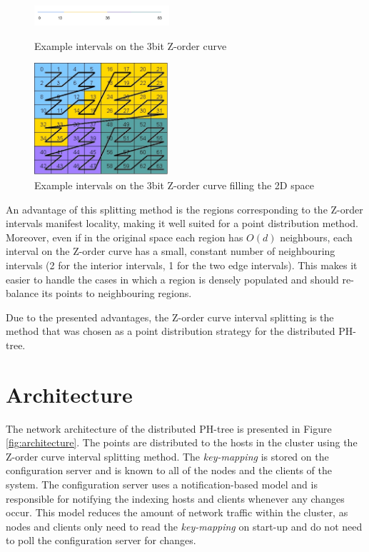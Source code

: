 \documentclass[11pt,a4paper]{globis-book}
\begin{document}
\begin{figure}[t]
    \centering
\parbox{5cm}{
    \includegraphics[width=5cm]{images/zorder-line}
    \caption{Example intervals on the 3bit Z-order curve}
    \label{fig:zorder-line}}
\qquad
\begin{minipage}{5cm}
    \includegraphics[width=5cm]{images/zorder-square}
    \caption{Example intervals on the 3bit Z-order curve filling the 2D space}
    \label{fig:zorder-square}
\end{minipage}
\end{figure}

An advantage of this splitting method is the regions corresponding to the Z-order intervals manifest locality, making it well suited for a point distribution method. Moreover, even if in the original space each region has $O(d)$ neighbours, each interval on the Z-order curve has a small, constant number of neighbouring intervals (2 for the interior intervals, 1 for the two edge intervals). This makes it easier to handle the cases in which a region is densely populated and should re-balance its points to neighbouring regions. 

Due to the presented advantages, the Z-order curve interval splitting is the method that was chosen as a point distribution strategy for the distributed PH-tree. 

\section{Architecture}
\label{sec:distindex-architectures}

The network architecture of the distributed PH-tree is presented in Figure \ref{fig:architecture}. The points are distributed to the hosts in the cluster using the Z-order curve interval splitting method. The \textit{key-mapping} is stored on the configuration server and is known to all of the nodes and the clients of the system. The configuration server uses a notification-based model and is responsible for notifying the indexing hosts and clients whenever any changes occur. This model reduces the amount of network traffic within the cluster, as nodes and clients only need to read the \textit{key-mapping} on start-up and do not need to poll the configuration server for changes. 
\end{document}
